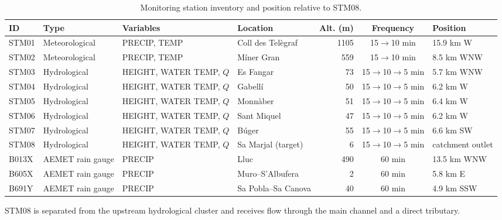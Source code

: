 \documentclass[twocolumn,twoside,a4paper,10pt]{IEEEtran}
\begin{document}
\begin{table}[!t]
    \caption{Monitoring station inventory and position relative to STM08.}
    \label{tab:stations}
    \centering
    \footnotesize
    \begin{tabular}{@{}llllrcl@{}}
        \toprule
        \textbf{ID} & \textbf{Type} & \textbf{Variables} & \textbf{Location} &
        \textbf{Alt. (m)} & \textbf{Frequency} & \textbf{Position} \\
        \midrule
        STM01 & Meteorological & PRECIP, TEMP & Coll des Tel\`{e}graf & 1105 &
        15$\rightarrow$10 min & 15.9 km W \\
        STM02 & Meteorological & PRECIP, TEMP & M\'{i}ner Gran & 559 &
        15$\rightarrow$10 min & 8.5 km WNW \\
        STM03 & Hydrological & HEIGHT, WATER TEMP, $Q$ & Es Fangar & 73 &
        15$\rightarrow$10$\rightarrow$5 min & 5.7 km WNW \\
        STM04 & Hydrological & HEIGHT, WATER TEMP, $Q$ & Gabell\'{i} & 50 &
        15$\rightarrow$10$\rightarrow$5 min & 6.2 km W \\
        STM05 & Hydrological & HEIGHT, WATER TEMP, $Q$ & Monn\`{a}ber & 51 &
        15$\rightarrow$10$\rightarrow$5 min & 6.4 km W \\
        STM06 & Hydrological & HEIGHT, WATER TEMP, $Q$ & Sant Miquel & 47 &
        15$\rightarrow$10$\rightarrow$5 min & 6.2 km W \\
        STM07 & Hydrological & HEIGHT, WATER TEMP, $Q$ & B\'{u}ger & 55 &
        15$\rightarrow$10$\rightarrow$5 min & 6.6 km SW \\
        STM08 & Hydrological & HEIGHT, WATER TEMP, $Q$ & Sa Marjal (target) & 6 &
        15$\rightarrow$10$\rightarrow$5 min & catchment outlet \\
        \midrule
        B013X & AEMET rain gauge & PRECIP & Lluc & 490 & 60 min & 13.5 km WNW \\
        B605X & AEMET rain gauge & PRECIP & Muro--S'Albufera & 2 & 60 min & 5.8 km E \\
        B691Y & AEMET rain gauge & PRECIP & Sa Pobla--Sa Canova & 40 & 60 min & 4.9 km SSW \\
        \bottomrule
    \end{tabular}
\end{table}

STM08 is separated from the upstream hydrological cluster and receives flow
through the main channel and a direct tributary.
\end{document}
